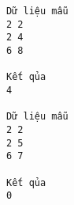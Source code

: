 \begin{verbatim}
Dữ liệu mẫu
2 2
2 4
6 8

Kết qủa
4

Dữ liệu mẫu
2 2
2 5
6 7

Kết qủa
0
\end{verbatim}